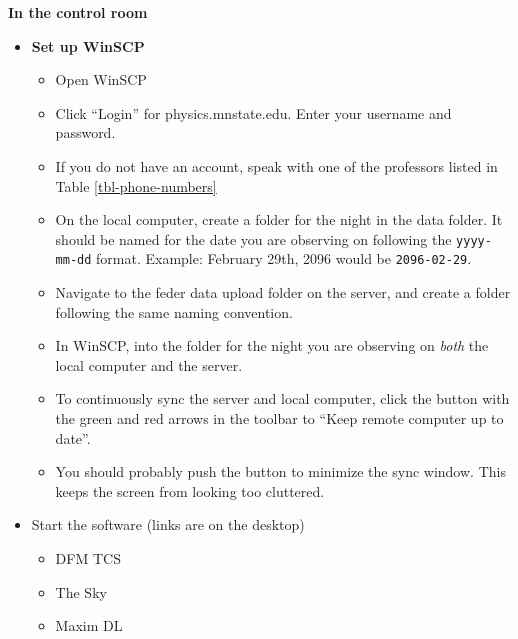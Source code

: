 \documentclass[letterpaper, 12pt]{report}
\begin{document}
{\large\textbf{In the control room}}
\begin{itemize}
	\item \textbf{Set up WinSCP}
	\begin{itemize}
		\item Open WinSCP
		\item Click ``Login'' for physics.mnstate.edu. Enter your username and password.
		\item If you do not have an account, speak with one of the professors listed in Table \ref{tbl-phone-numbers}
		\item On the local computer, create a folder for the night in the data folder. It should be named for the date you are observing on following the \texttt{yyyy-mm-dd} format. Example: February 29th, 2096 would be \texttt{2096-02-29}.
		\item Navigate to the feder data upload folder on the server, and create a folder following the same naming convention.
		\item In WinSCP,  into the folder for the night you are observing on \emph{both} the local computer and the server.
		\item To continuously sync the server and local computer, click the button with the green and red arrows in the toolbar to ``Keep remote computer up to date''.
		\item You should probably push the button to minimize the sync window. This keeps the screen from looking too cluttered.
	\end{itemize}
	\item Start the software (links are on the desktop)
	\begin{itemize}
		\item DFM TCS
		\item The Sky
		\item Maxim DL
	\end{itemize}

\end{itemize}
\end{document}

